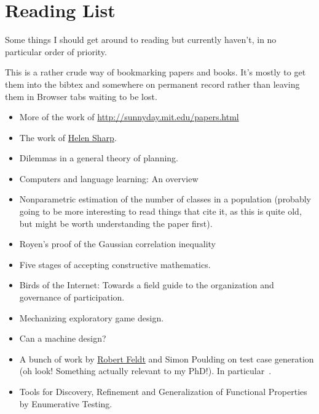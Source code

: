 \documentclass[a4paper]{book}
\begin{document}
\chapter{Reading List}

Some things I should get around to reading but currently haven't,
in no particular order of priority.

This is a rather crude way of bookmarking papers and books.
It's mostly to get them into the bibtex and somewhere on permanent record rather than leaving them in Browser tabs waiting to be lost.


\begin{itemize}
\item More of the work of \href{Nancy Leveson}{http://sunnyday.mit.edu/papers.html}
\item The work of \href{http://mcs.open.ac.uk/hcs2/}{Helen Sharp}.
\item Dilemmas in a general theory of planning\cite{rittel1973dilemmas}.
\item Computers and language learning: An overview\cite{warschauer1998computers}
\item Nonparametric estimation of the number of classes in a population\cite{chao1984nonparametric} (probably going to be more interesting to read things that cite it, as this is quite old, but might be worth understanding the paper first).
\item Royen’s proof of the Gaussian correlation inequality\cite{latala2017royen}
\item Five stages of accepting constructive mathematics\cite{bauer2017five}.
\item Birds of the Internet: Towards a field guide to the organization and governance of participation\cite{fish2011birds}.
\item Mechanizing exploratory game design\cite{smith2012mechanizing}.
\item Can a machine design?\cite{cross2001can}
\item A bunch of work by \href{http://www.robertfeldt.net/}{Robert Feldt} and Simon Poulding on test case generation
(oh look! Something actually relevant to my PhD!).
In particular~\cite{DBLP:conf/icst/PouldingF15, DBLP:conf/issre/FeldtP13, DBLP:conf/icse/FeldtP15}.
\item Tools for Discovery, Refinement and Generalization of Functional Properties by Enumerative Testing\cite{matela2017tools}.
\end{itemize}

{}

\end{document}
